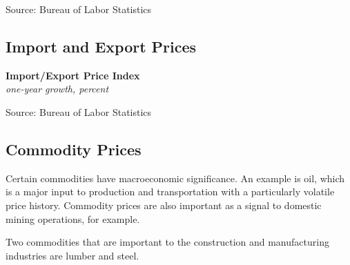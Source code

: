 \documentclass{report}
\makeatletter
\newcommand{\tbllink}[1]{\href{https://raw.githubusercontent.com/bdecon/US-chartbook/master/chartbook/data/#1}{\faTable}}
\newcommand*\short[1]{\expandafter\@gobbletwo\number\numexpr#1\relax}
\newcommand{\dateaxisticks}{
		date coordinates in=x, axis line style={draw=none},
		xmax={2023-10-01},
		max space between ticks=40,	    
		xtick={{1990-01-01}, {1992-01-01}, {1994-01-01}, 
			{1996-01-01}, {1998-01-01}, {2000-01-01}, 
			{2002-01-01}, {2004-01-01}, {2006-01-01},
			{2008-01-01}, {2010-01-01}, {2012-01-01}, {2014-01-01},
		    {2016-01-01}, {2018-01-01}, {2020-01-01}, {2022-01-01}, 
		    {2024-01-01}, {2026-01-01}},
		minor xtick={{1989-01-01}, {1991-01-01}, {1993-01-01},
			{1995-01-01}, {1997-01-01}, {1999-01-01}, 
			{2001-01-01}, {2003-01-01}, {2005-01-01}, {2007-01-01},
		    {2009-01-01}, {2011-01-01}, {2013-01-01}, {2015-01-01},
		    {2017-01-01}, {2019-01-01}, {2021-01-01}, {2023-01-01}, 
		    {2025-01-01}, {2027-01-01}},
		enlarge y limits={0.06}, enlarge x limits={0.01},
		}
\newcommand{\bbar}[2]{extra #1 ticks = {{#2}}, extra #1 tick labels = ,
		extra #1 tick style = {grid=major, grid style={thick, black!25}},}
\newcommand{\stdline}[4]{\addplot[very thick, no markers, color=#1] 
		table [x=#2, y=#3, col sep=comma] {#4};	}
\newcommand{\rbars}{
		\fill[color=black!10] (axis cs:{1990-07-01},\pgfkeysvalueof{/pgfplots/ymin}) rectangle 
			(axis cs:{1991-03-01}, \pgfkeysvalueof{/pgfplots/ymax});
		\fill[color=black!10] (axis cs:{2007-12-01},\pgfkeysvalueof{/pgfplots/ymin}) rectangle 
			(axis cs:{2009-07-01}, \pgfkeysvalueof{/pgfplots/ymax});
		\fill[color=black!10] (axis cs:{2001-03-01},\pgfkeysvalueof{/pgfplots/ymin}) rectangle 
			(axis cs:{2001-11-01}, \pgfkeysvalueof{/pgfplots/ymax});
		\fill[color=black!10] (axis cs:{2020-02-01},\pgfkeysvalueof{/pgfplots/ymin}) rectangle 
			(axis cs:{2020-05-01}, \pgfkeysvalueof{/pgfplots/ymax});}
\makeatother
\begin{document}
{{\begin{minipage}{0.76\textwidth}
\footnotesize{Source: Bureau of Labor Statistics} \hfill \tbllink{ppi_monthly.csv}
\end{minipage}
\newpage
\begin{minipage}{0.76\textwidth}
\hypertarget{prex}{\label{prex}}
\subsection*{Import and Export Prices}
\small 
{}
\vspace{1mm}

\normalsize \textbf{Import/Export Price Index}\\
\footnotesize{\textit{one-year growth, percent}}\\
\vspace{2.8cm}

\hspace{4mm} 
\vspace{1mm}

\footnotesize{Source: Bureau of Labor Statistics} \hfill \tbllink{mxpi.csv}
\vspace{2mm}

\hypertarget{prco}{\label{prco}}
\subsection*{Commodity Prices}
\vspace*{-1mm}

\small Certain commodities have macroeconomic significance. An example is oil, which is a major input to production and transportation with a particularly volatile price history. Commodity prices are also important as a signal to domestic mining operations, for example. 

Two commodities that are important to the construction and manufacturing industries are lumber and steel.  
 
\vspace{2mm}


\end{minipage}}}
\end{document}

